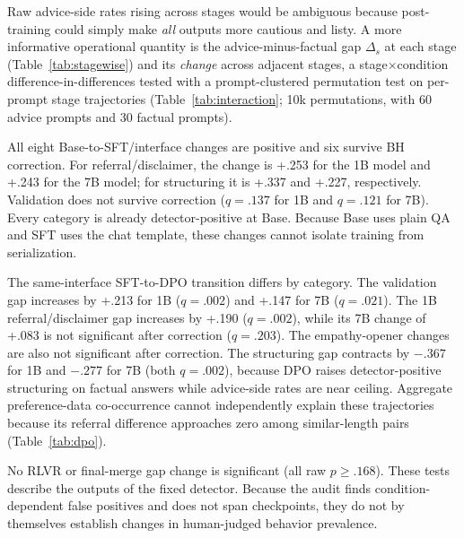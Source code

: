 \documentclass[11pt]{article}
\begin{document}
Raw advice-side rates rising across stages would be ambiguous because post-training
could simply make \emph{all} outputs more cautious and listy. A more informative
operational quantity is the advice-minus-factual gap $\Delta_s$ at each stage
(Table~\ref{tab:stagewise}) and its \emph{change} across adjacent stages, a
stage$\times$condition difference-in-differences tested with a prompt-clustered
permutation test on per-prompt stage trajectories (Table~\ref{tab:interaction};
10k permutations, with 60 advice prompts and 30 factual prompts).

All eight Base-to-SFT/interface changes are positive and six survive BH
correction. For referral/disclaimer, the change is +.253 for the 1B model and
+.243 for the 7B model; for structuring it is +.337 and +.227, respectively.
Validation does not survive correction ($q=.137$ for 1B and $q=.121$ for 7B).
Every category is already detector-positive at Base. Because Base uses plain QA
and SFT uses the chat template, these changes cannot isolate training from
serialization.

The same-interface SFT-to-DPO transition differs by category. The validation
gap increases by +.213 for 1B ($q=.002$) and +.147 for 7B ($q=.021$). The 1B
referral/disclaimer gap increases by +.190 ($q=.002$), while its 7B change of
+.083 is not significant after correction ($q=.203$). The empathy-opener
changes are also not significant after correction. The structuring gap
contracts by $-.367$ for 1B and $-.277$ for 7B (both $q=.002$), because DPO
raises detector-positive structuring on factual answers while advice-side rates
are near ceiling. Aggregate preference-data co-occurrence cannot independently
explain these trajectories because its referral difference approaches zero
among similar-length pairs (Table~\ref{tab:dpo}).

No RLVR or final-merge gap change is significant (all raw $p\geq.168$). These
tests describe the outputs of the fixed detector. Because the audit finds
condition-dependent false positives and does not span checkpoints, they do not
by themselves establish changes in human-judged behavior prevalence.
\end{document}
